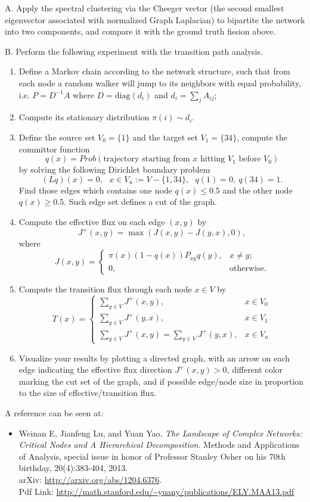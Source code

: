 \documentclass[11pt]{article}
\def\diag{{\mathrm{diag}}}
\begin{document}
A. Apply the spectral clustering via the Cheeger vector (the second smallest eigenvector associated with normalized Graph Laplacian) to bipartite the network into two components, and compare it with the ground truth fission above.  

B. Perform the following experiment with the transition path analysis. 
\begin{enumerate}
\item Define a Markov chain according to the network structure, such that from each node a random walker will jump to its neighbors with equal probability, i.e. $P=D^{-1} A$ where $D=\diag(d_i)$ and $d_i = \sum_j A_{ij}$;
\item Compute its stationary distribution $\pi(i)\sim d_i$. 
\item Define the source set $V_0=\{1\}$ and the target set $V_1=\{34\}$, compute the committor function
\[  q(x) = Prob(\mbox{trajectory starting from $x$ hitting $V_1$ before $V_0$}) \]
by solving the following Dirichlet boundary problem
\[ (L q)(x) = 0, \ \ \ x\in V_u := V -\{1,34\}, \ \ \ q(1)=0,\ q(34)=1. \]
Find those edges which contains one node $q(x)\leq 0.5$ and the other node $q(x)\geq 0.5$. Such edge set defines a cut of the graph. 
\item Compute the effective flux on each edge $(x,y)$ by 
\[ J^+(x,y) = \max(J(x,y) - J(y,x), 0 ),\]
where
\[     J(x,y) = 
     \begin{cases}
       \pi(x) (1-q(x)) P_{xy}q(y), & x\neq y;\\
       0, & \text{otherwise}.
     \end{cases}
\]
\item Compute the transition flux through each node $x\in V$ by 
\[
     T(x) = \left\{\begin{array}{ll}
     \sum_{y \in V} J^+(x,y) ,& x\in V_0 \\
     \sum_{y\in V} J^+(y,x), & x\in V_1 \\
     \sum_{y\in V} J^+(x,y) = \sum_{y\in V} J^+(y,x), & x\in V_u 
     \end{array}\right.
\]
\item Visualize your results by plotting a directed graph, with an arrow on each edge indicating the effective flux direction $J^+(x,y)>0$, different color marking the cut set of the graph, and if possible edge/node size in proportion to the size of effective/transition flux.
\end{enumerate}

A reference can be seen at:
\begin{itemize}
\item Weinan E, Jianfeng Lu, and Yuan Yao. {\it The Landscape of Complex Networks: Critical Nodes and A Hierarchical Decomposition}. Methods and Applications of Analysis, special issue in honor of Professor Stanley Osher on his 70th birthday, 20(4):383-404, 2013. \\ arXiv: \url{http://arxiv.org/abs/1204.6376}. \\
Pdf Link: \url{http://math.stanford.edu/~yuany/publications/ELY.MAA13.pdf} 
\end{itemize}
\end{document}
